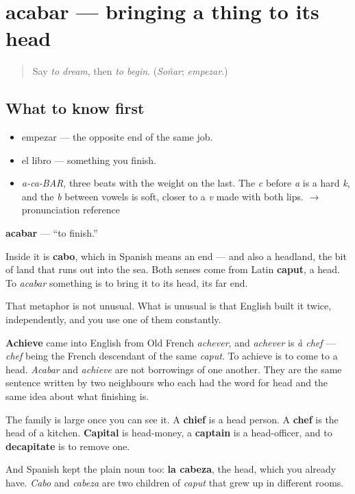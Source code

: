 \section[acabar]{acabar — bringing a thing to its head}

\label{lesson:ES-C382-acabar}



\begin{quote}
Say \emph{to dream}, then \emph{to begin}. (\emph{Soñar}; \emph{empezar}.)
\end{quote}

\subsection*{What to know first}
\begin{itemize}
\raggedright
  \item empezar — the opposite end of the same job.
  \item el libro — something you finish.
\end{itemize}

\begin{sounds}
\begin{itemize}
\raggedright
  \item \emph{a-ca-BAR}, three beats with the weight on the last. The \emph{c} before \emph{a} is a hard \emph{k}, and the \emph{b} between vowels is soft, closer to a \emph{v} made with both lips. $\to$ pronunciation reference
\end{itemize}
\end{sounds}

\begin{cousinweb}
\textbf{acabar} — \textquotedblleft{}to finish.\textquotedblright{}

Inside it is \textbf{cabo}, which in Spanish means an end — and also a headland, the bit of land that runs out into the sea. Both senses come from Latin \textbf{caput}, a head. To \emph{acabar} something is to bring it to its head, its far end.

That metaphor is not unusual. What is unusual is that English built it twice, independently, and you use one of them constantly.

\textbf{Achieve} came into English from Old French \emph{achever}, and \emph{achever} is \emph{à chef} — \emph{chef} being the French descendant of the same \emph{caput}. To achieve is to come to a head. \emph{Acabar} and \emph{achieve} are not borrowings of one another. They are the same sentence written by two neighbours who each had the word for head and the same idea about what finishing is.

The family is large once you can see it. A \textbf{chief} is a head person. A \textbf{chef} is the head of a kitchen. \textbf{Capital} is head-money, a \textbf{captain} is a head-officer, and to \textbf{decapitate} is to remove one.

And Spanish kept the plain noun too: \textbf{la cabeza}, the head, which you already have. \emph{Cabo} and \emph{cabeza} are two children of \emph{caput} that grew up in different rooms.
\end{cousinweb}

